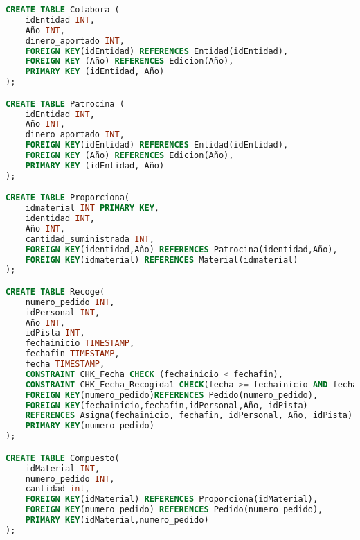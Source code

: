 \begin{lstlisting}[language=sql]
CREATE TABLE Colabora (
	idEntidad INT,
	Año INT,
	dinero_aportado INT,
	FOREIGN KEY(idEntidad) REFERENCES Entidad(idEntidad),
	FOREIGN KEY (Año) REFERENCES Edicion(Año),
	PRIMARY KEY (idEntidad, Año)
);

CREATE TABLE Patrocina (
	idEntidad INT,
	Año INT,
	dinero_aportado INT,
	FOREIGN KEY(idEntidad) REFERENCES Entidad(idEntidad),
	FOREIGN KEY (Año) REFERENCES Edicion(Año),
	PRIMARY KEY (idEntidad, Año)
);

CREATE TABLE Proporciona(
	idmaterial INT PRIMARY KEY,
	identidad INT,
	Año INT,
	cantidad_suministrada INT,
	FOREIGN KEY(identidad,Año) REFERENCES Patrocina(identidad,Año),
	FOREIGN KEY(idmaterial) REFERENCES Material(idmaterial)
);

CREATE TABLE Recoge(
	numero_pedido INT,
	idPersonal INT,
	Año INT,
	idPista INT,
	fechainicio TIMESTAMP,
	fechafin TIMESTAMP,
	fecha TIMESTAMP,
	CONSTRAINT CHK_Fecha CHECK (fechainicio < fechafin),
	CONSTRAINT CHK_Fecha_Recogida1 CHECK(fecha >= fechainicio AND fecha <= fechafin),
	FOREIGN KEY(numero_pedido)REFERENCES Pedido(numero_pedido),
	FOREIGN KEY(fechainicio,fechafin,idPersonal,Año, idPista)
	REFERENCES Asigna(fechainicio, fechafin, idPersonal, Año, idPista),
	PRIMARY KEY(numero_pedido)
);

CREATE TABLE Compuesto(
	idMaterial INT,
	numero_pedido INT,
	cantidad int,
	FOREIGN KEY(idMaterial) REFERENCES Proporciona(idMaterial),
	FOREIGN KEY(numero_pedido) REFERENCES Pedido(numero_pedido),
	PRIMARY KEY(idMaterial,numero_pedido)
);
\end{lstlisting}
